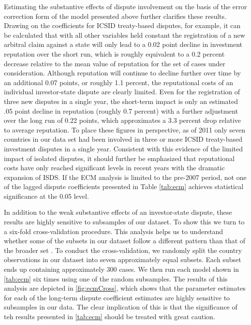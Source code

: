 \documentclass[12pt,onesided]{amsart}
\begin{document}

Estimating the substantive effects of dispute involvement on the basis of the error correction form of the model presented above further clarifies these results. Drawing on the coefficients for ICSID treaty-based disputes, for example, it can be calculated that with all other variables held constant the registration of a new arbitral claim against a state will only lead to a 0.02 point decline in investment reputation over the short run, which is roughly equivalent to a 0.2 percent decrease relative to the mean value of reputation for the set of cases under consideration. Although reputation will continue to decline further over time by an additional 0.07 points, or roughly 1.1 percent, the reputational costs of an individual investor-state dispute are clearly limited. Even for the registration of three new disputes in a single year, the short-term impact is only an estimated .05 point decline in reputation (roughly 0.7 percent) with a further adjustment over the long run of 0.22 points, which approximates a 3.3 percent drop relative to average reputation. To place these figures in perspective, as of 2011 only seven countries in our data set had been involved in three or more ICSID treaty-based investment disputes in a single year. Consistent with this evidence of the limited impact of isolated disputes, it should further be emphasized that reputational costs have only reached significant levels in recent years with the dramatic expansion of ISDS. If the ECM analysis is limited to the pre-2007 period, not one of the lagged dispute coefficients presented in Table \ref{tab:ecm} achieves statistical significance at the 0.05 level. 

In addition to the weak substantive effects of an investor-state dispute, these results are highly sensitive to subsamples of our dataset. To show this we turn to a six-fold cross-validation procedure. This analysis helps us to understand whether some of the subsets in our dataset follow a different pattern than that of the broader set \citep{beck2008time}. To conduct the cross-validation, we randomly split the country observations in our dataset into seven approximately equal subsets. Each subset ends up containing approximately 300 cases. We then run each model shown in \ref{tab:ecm} six times using one of the random subsamples. The results of this analysis are depicted in \ref{fig:ecmCross}, which shows that the parameter estimates for each of the long-term dispute coefficient estimates are highly sensitive to subsamples in our data. The clear implication of this is that the significance of teh results presented in \ref{tab:ecm} should be treated with great caution.
\end{document}
